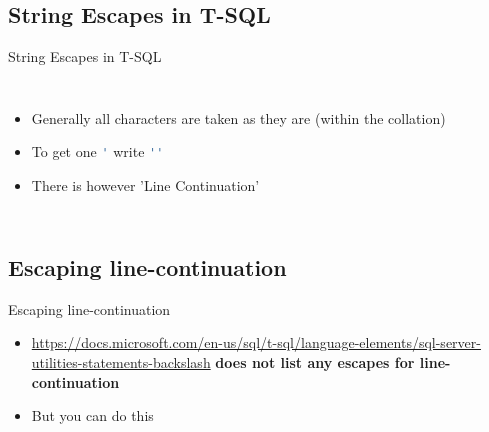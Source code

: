 \documentclass[english,aspectratio=169,handout]{beamer}
\begin{document}
\subsection{String Escapes in T-SQL}
\begin{frame}{String Escapes in T-SQL}
\begin{columns}
        \begin{itemize}
            \item Generally all characters are taken as they are (within the collation)
            \item To get one \lstinline[language=SQL]{'} write \lstinline[language=SQL]{''}
            \item There is however 'Line Continuation' \only<1|handout:0>{}
        \end{itemize}
        \begin{center}
        \end{center}
    \end{columns}
\end{frame}

\subsection{Escaping line-continuation}
\begin{frame}{Escaping line-continuation}
\begin{itemize}
    \item \url{https://docs.microsoft.com/en-us/sql/t-sql/language-elements/sql-server-utilities-statements-backslash} \textbf{does not list any escapes for line-continuation}
    \item But you can do this 
\end{itemize}
\end{frame}
\end{document}
